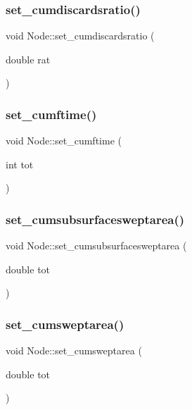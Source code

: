 \mbox{\label{class_node_ae1789d3b6f956340ed3777abf0c97b22}} 
\subsubsection{\texorpdfstring{set\_cumdiscardsratio()}{set\_cumdiscardsratio()}}
{\footnotesize\ttfamily void Node\+::set\+\_\+cumdiscardsratio (\begin{DoxyParamCaption}\item[{double}]{rat }\end{DoxyParamCaption})}

\mbox{\label{class_node_a01ecdcd5b872aa2cd73279797813f581}} 
\subsubsection{\texorpdfstring{set\_cumftime()}{set\_cumftime()}}
{\footnotesize\ttfamily void Node\+::set\+\_\+cumftime (\begin{DoxyParamCaption}\item[{int}]{tot }\end{DoxyParamCaption})}

\mbox{\label{class_node_a94f17bf88b89fc9abc1cc1b8345d7734}} 
\subsubsection{\texorpdfstring{set\_cumsubsurfacesweptarea()}{set\_cumsubsurfacesweptarea()}}
{\footnotesize\ttfamily void Node\+::set\+\_\+cumsubsurfacesweptarea (\begin{DoxyParamCaption}\item[{double}]{tot }\end{DoxyParamCaption})}

\mbox{\label{class_node_a9ad4d972466f00f732804a5d32a9a27d}} 
\subsubsection{\texorpdfstring{set\_cumsweptarea()}{set\_cumsweptarea()}}
{\footnotesize\ttfamily void Node\+::set\+\_\+cumsweptarea (\begin{DoxyParamCaption}\item[{double}]{tot }\end{DoxyParamCaption})}

